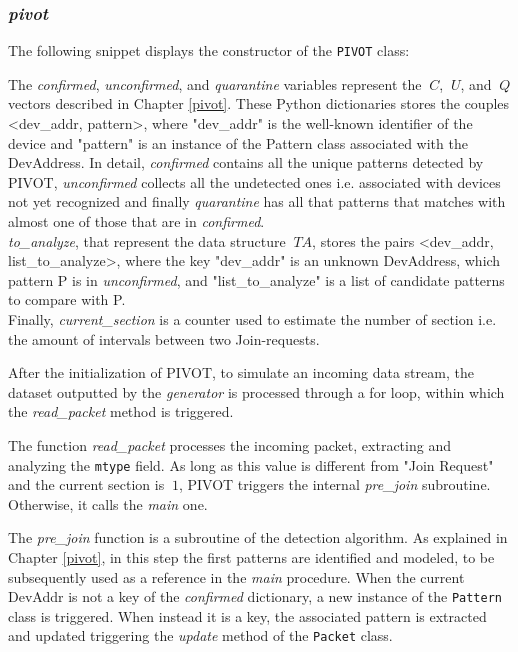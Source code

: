 \subsubsection{\textit{pivot}}
The following snippet displays the constructor of the \texttt{PIVOT} class:

The \textit{confirmed}, \textit{unconfirmed}, and \textit{quarantine} variables represent the \(\ C \), \(\ U \), and \(\ Q \) vectors described in Chapter \ref{pivot}. These Python dictionaries stores the couples <dev\_addr, pattern>, where "dev\_addr" is the well-known identifier of the device and "pattern" is an instance of the Pattern class associated with the DevAddress. In detail, \textit{confirmed} contains all the unique patterns detected by PIVOT, \textit{unconfirmed} collects all the undetected ones i.e. associated with devices not yet recognized and finally \textit{quarantine} has all that patterns that matches with almost one of those that are in \textit{confirmed}.
\\
\textit{to\_analyze}, that represent the data structure \(\ TA \), stores the pairs <dev\_addr, list\_to\_analyze>, where the key "dev\_addr" is an unknown DevAddress, which pattern P is in \textit{unconfirmed}, and "list\_to\_analyze" is a list of candidate patterns to compare with P.
\\
Finally, \textit{current\_section} is a counter used to estimate the number of section i.e. the amount of intervals between two Join-requests.

\vspace{3mm}

After the initialization of PIVOT, to simulate an incoming data stream, the dataset outputted by the \textit{generator} is processed through a for loop, within which the \textit{read\_packet} method is triggered.

\vspace{3mm}

\vspace{3mm}

The function \textit{read\_packet} processes the incoming packet, extracting and analyzing the \texttt{mtype} field. As long as this value is different from "Join Request" and the current section is \(\ 1 \), PIVOT triggers the internal \textit{pre\_join} subroutine. Otherwise, it calls the \textit{main} one.

\vspace{3mm}

\vspace{3mm}

The \textit{pre\_join} function is a subroutine of the detection algorithm. As explained in Chapter \ref{pivot}, in this step the first patterns are identified and modeled, to be subsequently used as a
reference in the \textit{main} procedure. When the current DevAddr is not a key of the \textit{confirmed} dictionary, a new instance of the \texttt{Pattern} class is triggered. When instead it is a key, the associated pattern is extracted and updated triggering the \textit{update} method of the \texttt{Packet} class.

